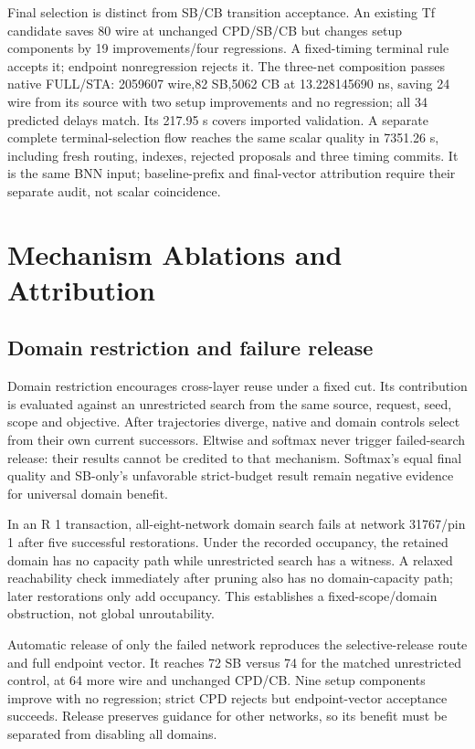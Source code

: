 \documentclass[conference,10pt]{IEEEtran}
\begin{document}
Final selection is distinct from SB/CB transition acceptance. An existing Tf candidate saves 80 wire at unchanged CPD/SB/CB but changes setup components by 19 improvements/four regressions. A fixed-timing terminal rule accepts it; endpoint nonregression rejects it. The three-net composition passes native FULL/STA: 2059607 wire,82 SB,5062 CB at 13.228145690 ns, saving 24 wire from its source with two setup improvements and no regression; all 34 predicted delays match. Its 217.95 s covers imported validation. A separate complete terminal-selection flow reaches the same scalar quality in 7351.26 s, including fresh routing, indexes, rejected proposals and three timing commits. It is the same BNN input; baseline-prefix and final-vector attribution require their separate audit, not scalar coincidence.
\section{Mechanism Ablations and Attribution}
\subsection{Domain restriction and failure release}
Domain restriction encourages cross-layer reuse under a fixed cut. Its contribution is evaluated against an unrestricted search from the same source, request, seed, scope and objective. After trajectories diverge, native and domain controls select from their own current successors. Eltwise and softmax never trigger failed-search release: their results cannot be credited to that mechanism. Softmax's equal final quality and SB-only's unfavorable strict-budget result remain negative evidence for universal domain benefit.

In an R 1 transaction, all-eight-network domain search fails at network 31767/pin 1 after five successful restorations. Under the recorded occupancy, the retained domain has no capacity path while unrestricted search has a witness. A relaxed reachability check immediately after pruning also has no domain-capacity path; later restorations only add occupancy. This establishes a fixed-scope/domain obstruction, not global unroutability.

Automatic release of only the failed network reproduces the selective-release route and full endpoint vector. It reaches 72 SB versus 74 for the matched unrestricted control, at 64 more wire and unchanged CPD/CB. Nine setup components improve with no regression; strict CPD rejects but endpoint-vector acceptance succeeds. Release preserves guidance for other networks, so its benefit must be separated from disabling all domains.
\end{document}

